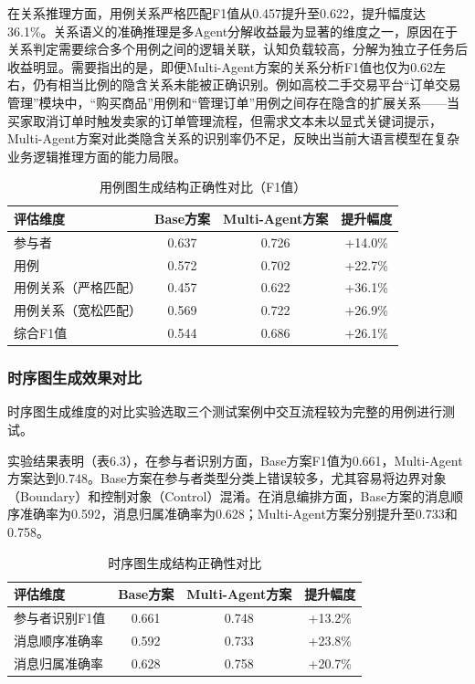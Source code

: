 在关系推理方面，用例关系严格匹配F1值从0.457提升至0.622，提升幅度达36.1\%。关系语义的准确推理是多Agent分解收益最为显著的维度之一，原因在于关系判定需要综合多个用例之间的逻辑关联，认知负载较高，分解为独立子任务后收益明显。需要指出的是，即便Multi-Agent方案的关系分析F1值也仅为0.62左右，仍有相当比例的隐含关系未能被正确识别。例如高校二手交易平台“订单交易管理”模块中，“购买商品”用例和“管理订单”用例之间存在隐含的扩展关系——当买家取消订单时触发卖家的订单管理流程，但需求文本未以显式关键词提示，Multi-Agent方案对此类隐含关系的识别率仍不足，反映出当前大语言模型在复杂业务逻辑推理方面的能力局限。

\begin{table}[htbp]
    \centering
    \caption{用例图生成结构正确性对比（F1值）}
    \label{tab:usecase_comparison}
    \begin{tabular}{lccc}
        \toprule
        评估维度 & Base方案 & Multi-Agent方案 & 提升幅度 \\
        \midrule
        参与者 & 0.637 & 0.726 & +14.0\% \\
        用例 & 0.572 & 0.702 & +22.7\% \\
        用例关系（严格匹配） & 0.457 & 0.622 & +36.1\% \\
        用例关系（宽松匹配） & 0.569 & 0.722 & +26.9\% \\
        综合F1值 & 0.544 & 0.686 & +26.1\% \\
        \bottomrule
    \end{tabular}
\end{table}

\subsubsection{时序图生成效果对比}

时序图生成维度的对比实验选取三个测试案例中交互流程较为完整的用例进行测试。

实验结果表明（表6.3），在参与者识别方面，Base方案F1值为0.661，Multi-Agent方案达到0.748。Base方案在参与者类型分类上错误较多，尤其容易将边界对象（Boundary）和控制对象（Control）混淆。在消息编排方面，Base方案的消息顺序准确率为0.592，消息归属准确率为0.628；Multi-Agent方案分别提升至0.733和0.758。

\begin{table}[htbp]
    \centering
    \caption{时序图生成结构正确性对比}
    \label{tab:sequence_comparison}
    \begin{tabular}{lccc}
        \toprule
        评估维度 & Base方案 & Multi-Agent方案 & 提升幅度 \\
        \midrule
        参与者识别F1值 & 0.661 & 0.748 & +13.2\% \\
        消息顺序准确率 & 0.592 & 0.733 & +23.8\% \\
        消息归属准确率 & 0.628 & 0.758 & +20.7\% \\
        \bottomrule
    \end{tabular}
\end{table}


